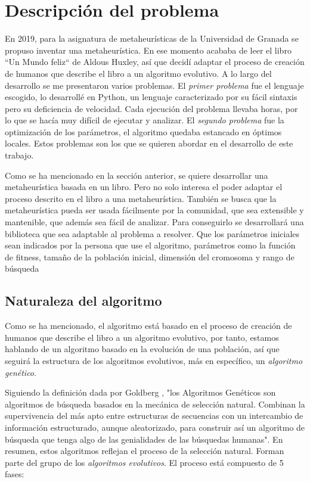 \chapter{Descripción del problema}

En 2019, para la asignatura de metaheurísticas de la Universidad de Granada \cite{merelo_molina_2021} se propuso inventar una metaheurística. En
ese momento acababa de leer el libro ``Un Mundo feliz`` de Aldous Huxley, así que decidí adaptar el proceso de creación 
de humanos que describe el libro a un algoritmo evolutivo. A lo largo del desarrollo se me presentaron varios problemas. El
\textit{primer problema} fue el lenguaje escogido, lo desarrollé en Python, un lenguaje caracterizado por su fácil sintaxis pero su deficiencia de
velocidad. Cada ejecución del problema llevaba horas, por lo que se hacía muy difícil de ejecutar y analizar. El
\textit{segundo problema} fue la optimización de los parámetros, el algoritmo quedaba estancado en óptimos locales. Estos problemas son 
los que se quieren abordar en el desarrollo de este trabajo.

Como se ha mencionado en la sección anterior, se quiere desarrollar una metaheurística basada en un libro. Pero no solo interesa
el poder adaptar el proceso descrito en el libro a una metaheurística. También se busca que la metaheurística pueda ser
usada fácilmente por la comunidad, que sea extensible y mantenible, que además sea fácil de analizar. Para conseguirlo
se desarrollará una biblioteca que sea adaptable al problema a resolver. Que los parámetros iniciales sean 
indicados por la persona que use el algoritmo, parámetros como la función de fitness, tamaño de la población inicial,
dimensión del cromosoma y rango de búsqueda

\section{Naturaleza del algoritmo}

Como se ha mencionado, el algoritmo está basado en el proceso de creación de humanos que describe el libro a un algoritmo evolutivo, 
por tanto, estamos hablando de un algoritmo basado en la evolución de una población, así que seguirá la estructura de los
algoritmos evolutivos, más en específico, un \emph{algoritmo genético}. 

Siguiendo la definición dada por Goldberg \cite{goldberg89}, "los Algoritmos Genéticos son algoritmos de búsqueda
basados en la mecánica de selección natural. Combinan la supervivencia del más apto entre estructuras de secuencias con un intercambio de 
información estructurado, aunque aleatorizado, para construir así un algoritmo de búsqueda que tenga algo de las genialidades de las 
búsquedas humanas". En resumen, estos algoritmos reflejan el proceso de la selección natural. Forman parte del grupo de los \emph{algoritmos evolutivos}. 
El proceso está compuesto de 5 fases:


